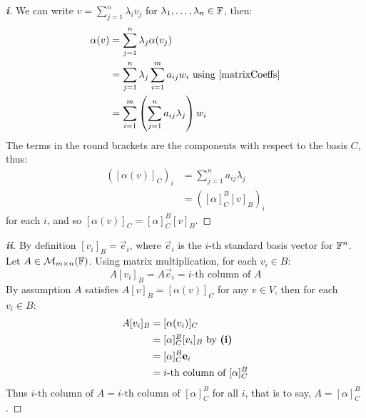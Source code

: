 \documentclass[../main.tex]{subfiles}
\begin{document}
\begin{proof}[\textbf{i}]
  We can write $v = \sum_{j = 1}^{n} \lambda_i v_j$ for $\lambda_1, \ldots, \lambda_n \in \F$, then:
  \begin{align*}
    \alpha(v) &= \sum_{j = 1}^{n} \lambda_j \alpha(v_j) \\
              &= \sum_{j = 1}^{n} \lambda_j \sum_{i = 1}^{m} a_{i j}w_i \text{ using \cref{matrixCoeffs}}\\
              &= \sum_{i = 1}^{m} \left(\sum_{j = 1}^{n} a_{i j} \lambda_j\right)w_i
  \end{align*}
  The terms in the round brackets are the components with respect to the basis $C$, thus:
  \begin{align*}
    ([\alpha(v)]_{C})_i &= \sum_{j = 1}^{n} a_{i j} \lambda_j \\
                        &= ([\alpha]^{B}_{C} [v]_B)_i
  \end{align*}
  for each $i$, and so $[\alpha(v)]_C = [\alpha]^{B}_{C} [v]_B$.
\end{proof}
\begin{proof}[\textbf{ii}]
  By definition $[v_i]_{B} = \vec{e}_i$, where $\vec{e}_i$ is the $i$-th standard basis vector for $\F^n$.
  Let $A \in \mathcal{M}_{m \times n}(\F)$.
  Using matrix multiplication, for each $v_i \in B$:
  \[
    A[v_i]_{B} = A \vec{e}_i = \text{$i$-th column of $A$}
  \]
  By assumption $A$ satisfies $A[v]_{B} = [\alpha(v)]_{C}$ for any $v \in V$, then for each $v_i \in B$:
  \begin{align*}
    A[v_i]_{B} &= [\alpha(v_i)]_{C} \\
               &= [\alpha]^{B}_{C} [v_i]_{B} \text{ by \textbf{(i)}} \\
               &= [\alpha]^{B}_{C} \vec{e}_i \\
               &= \text{$i$-th column of $[\alpha]^{B}_{C}$}
  \end{align*}
  Thus $\text{$i$-th column of $A$} = \text{$i$-th column of $[\alpha]^{B}_{C}$}$ for all $i$, that is to say, $A = [\alpha]^{B}_{C}$.
\end{proof}
\end{document}
